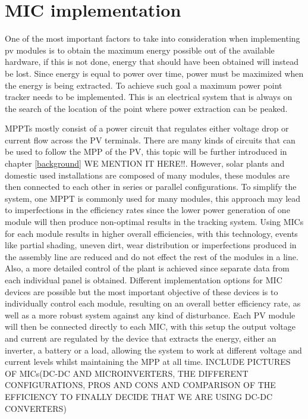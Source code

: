 
\section{MIC implementation}
One of the most important factors to take into consideration when implementing pv modules is to obtain the maximum energy possible out of the available hardware, if this is not done, energy that should have been obtained will instead be lost. Since energy is equal to power over time, power must be maximized when the energy is being extracted. To achieve such goal a maximum power point tracker needs to be implemented. This is an electrical system that is always on the search of the location of the point where power extraction can be peaked. 

MPPTs mostly consist of a power circuit that regulates either voltage drop or current flow across the PV terminals. There are many kinds of circuits that can be used to follow the MPP of the PV, this topic will be further introduced in chapter \ref{background} WE MENTION IT HERE!!. 
However, solar plants and domestic used installations are composed of many modules, these modules are then connected to each other in series or parallel configurations. To simplify the system, one MPPT is commonly used for many modules, this approach may lead to imperfections in the efficiency rates since the lower power generation of one module will then produce non-optimal results in the tracking system. 
Using MICs for each module results in higher overall efficiencies, with this technology, events like partial shading, uneven dirt, wear distribution or imperfections produced in the assembly line are reduced and do not effect the rest of the modules in a line. Also, a more detailed control of the plant is achieved since separate data from each individual panel is obtained.
Different implementation options for MIC devices are possible but the most important objective of these devices is to individually control each module, resulting on an overall better efficiency rate, as well as a more robust system against any kind of disturbance. Each PV module will then be connected directly to each MIC, with this setup the output voltage and current are regulated by the device that extracts the energy, either an inverter, a battery or a load, allowing the system to work at different voltage and current levels whilst maintaining the MPP at all time. INCLUDE PICTURES OF MICs(DC-DC AND MICROINVERTERS, THE DIFFERENT CONFIGURATIONS, PROS AND CONS AND COMPARISON OF THE EFFICIENCY TO FINALLY DECIDE THAT WE ARE USING DC-DC CONVERTERS)



